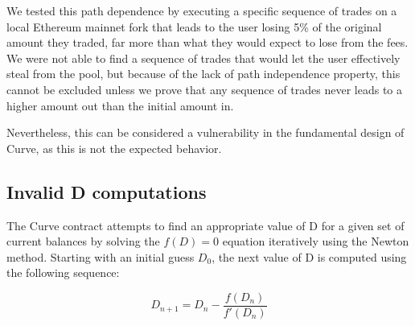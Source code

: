 \documentclass{article}
\begin{document}
    We tested this path dependence by executing a specific sequence of trades on a local Ethereum mainnet fork that leads to the user losing 5\% of the original amount they traded, far more than what they would expect to lose from the fees. We were not able to find a sequence of trades that would let the user effectively steal from the pool, but because of the lack of path independence property, this cannot be excluded unless we prove that any sequence of trades never leads to a higher amount out than the initial amount in.

    Nevertheless, this can be considered a vulnerability in the fundamental design of Curve, as this is not the expected behavior. 

    \subsection{Invalid D computations}
    
    The Curve contract attempts to find an appropriate value of D for a given set of current balances by solving the $f(D) = 0$ equation iteratively using the Newton method. Starting with an initial guess $D_{0}$, the next value of D is computed using the following sequence: 

    \begin{equation}
        D_{n+1} = D_{n} - \frac{f(D_{n})}{f'(D_{n})}
    \end{equation}
\end{document}
